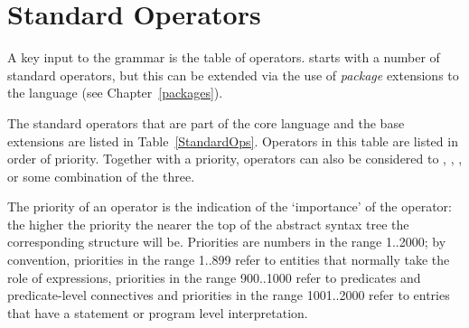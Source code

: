 \section{Standard Operators}
\label{standardOperators}
A key input to the grammar is the table of operators. \Sr starts with a number of standard operators, but this can be extended via the use of \emph{package} extensions to the language (see Chapter~\vref{packages}).

The standard operators that are part of the core language and the base extensions are listed in Table~\vref{StandardOps}. Operators in this table are listed in order of priority. Together with a priority, operators can also be considered to , , , or some combination of the three.

The priority of an operator is the indication of the `importance' of the operator: the higher the priority the nearer the top of the abstract syntax tree the corresponding structure will be. Priorities are numbers in the range 1..2000; by convention, priorities in the range 1..899 refer to entities that normally take the role of expressions, priorities in the range 900..1000 refer to predicates and predicate-level connectives and priorities in the range 1001..2000 refer to entries that have a statement or program level interpretation. 


